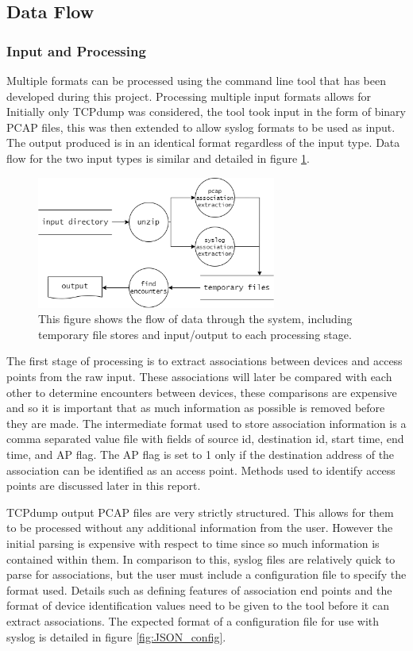 \subsection{Data Flow}

\subsubsection{Input and Processing}
Multiple formats can be processed using the command line tool that has been developed during this project. Processing multiple input formats allows for  Initially only TCPdump was considered, the tool took input in the form of binary PCAP files, this was then extended to allow syslog formats to be used as input. The output produced is in an identical format regardless of the input type. Data flow for the two input types is similar and detailed in figure \ref{fig:df_dia}.\newline
\begin{figure}[h]
    \centering
    \includegraphics[width=0.7\textwidth]{df_diagram.png}
    \caption{This figure shows the flow of data through the system, including temporary file stores and input/output to each processing stage.}
    \label{fig:df_dia}
\end{figure}

The first stage of processing is to extract associations between devices and access points from the raw input. These associations will later be compared with each other to determine encounters between devices, these comparisons are expensive and so it is important that as much information as possible is removed before they are made. The intermediate format used to store association information is  a comma separated value file with fields of source id, destination id, start time, end time, and AP flag. The AP flag is set to 1 only if the destination address of the association can be identified as an access point. Methods used to identify access points are discussed later in this report.

TCPdump output PCAP files are very strictly structured. This allows for them to be processed without any additional information from the user. However the initial parsing is expensive with respect to time since so much information is contained within them. In comparison to this, syslog files are relatively quick to parse for associations, but the user must include a configuration file to specify the format used. Details such as defining features of association end points and the format of device identification values need to be given to the tool before it can extract associations. The expected format of a configuration file for use with syslog is detailed in figure \ref{fig:JSON_config}.\newline

